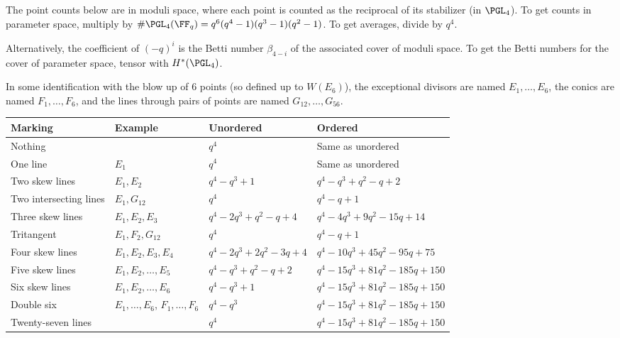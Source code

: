 \documentclass{article}
\begin{document}
The point counts below are in moduli space, where each point is counted as the reciprocal of its stabilizer (in $\PGL_4$). To get counts in parameter space, multiply by $\#\PGL_4(\FF_q) = q^6(q^4-1)(q^3-1)(q^2-1)$. To get averages, divide by $q^4$. 

Alternatively, the coefficient of $(-q)^i$ is the Betti number $\beta_{4-i}$ of the associated cover of moduli space. To get the Betti numbers for the cover of parameter space, tensor with $H^*(\PGL_4)$.

In some identification with the blow up of $6$ points (so defined up to $W(E_6)$), the exceptional divisors are named $E_1, \dots, E_6$, the conics are named $F_1, \dots, F_6$, and the lines through pairs of points are named $G_{12}, \dots, G_{56}$.

\begin{longtable}{llll}
\toprule
Marking & Example & Unordered & Ordered\\\midrule
Nothing & & $q^4$ & Same as unordered\\
One line & $E_1$ & $q^4$ & Same as unordered\\
Two skew lines & $E_1, E_2$ & $q^4 - q^3 + 1$ & $q^4 - q^3 + q^2 - q + 2$\\
Two intersecting lines & $E_1, G_{12}$ & $q^4$ & $q^4 - q + 1$\\
Three skew lines & $E_1, E_2, E_3$ & $q^4 - 2q^3 + q^2 - q + 4$ & $q^4 - 4q^3 + 9q^2 - 15q + 14$ \\
Tritangent & $E_1, F_2, G_{12}$ & $q^4$ & $q^4 - q + 1$\\
Four skew lines & $E_1, E_2, E_3, E_4$ & $q^4 - 2q^3 + 2q^2 - 3q + 4$ & $q^4 - 10q^3 + 45q^2 - 95q + 75$\\
Five skew lines & $E_1, E_2, \dots, E_5$ & $q^4 - q^3 + q^2 - q + 2$ & $q^4 - 15q^3 + 81q^2 - 185q + 150$\\
Six skew lines & $E_1, E_2, \dots, E_6$ & $q^4 - q^3 + 1$ & $q^4 - 15q^3 + 81q^2 - 185q + 150$\\
Double six & $E_1, \dots, E_6$, $F_1, \dots, F_6$ & $q^4 -q^3$ & $q^4 - 15q^3 + 81q^2 - 185q + 150$\\
Twenty-seven lines & & $q^4$ & $q^4 - 15q^3 + 81q^2 - 185q + 150$\\
\bottomrule
\end{longtable}
\end{document}

